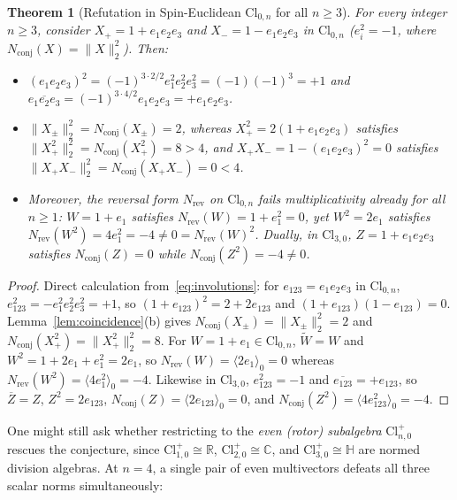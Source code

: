 \documentclass[11pt]{article}
\newtheorem{theorem}{Theorem}[section]
\theoremstyle{definition}
\newcommand{\Cl}{\mathrm{Cl}}
\newcommand{\R}{\mathbb{R}}
\newcommand{\C}{\mathbb{C}}
\newcommand{\HH}{\mathbb{H}}
\newcommand{\Nrev}{N_{\mathrm{rev}}}
\newcommand{\Nconj}{N_{\mathrm{conj}}}
\begin{document}
\begin{theorem}[Refutation in Spin-Euclidean $\Cl_{0,n}$ for all $n\ge 3$]\label{thm:ref-spin}
For every integer $n\ge 3$, consider $X_+=1+e_1e_2e_3$ and $X_-=1-e_1e_2e_3$ in $\Cl_{0,n}$ ($e_i^2=-1$, where $\Nconj(X)=\|X\|_2^2$). Then:
\begin{itemize}
  \item[(a)] $(e_1e_2e_3)^2=(-1)^{3\cdot 2/2}e_1^2e_2^2e_3^2=(-1)(-1)^3=+1$ and $\overline{e_1e_2e_3}=(-1)^{3\cdot 4/2}e_1e_2e_3=+e_1e_2e_3$.
  \item[(b)] $\|X_\pm\|_2^2=\Nconj(X_\pm)=2$, whereas $X_+^2=2(1+e_1e_2e_3)$ satisfies $\|X_+^2\|_2^2=\Nconj(X_+^2)=8>4$, and $X_+X_-=1-(e_1e_2e_3)^2=0$ satisfies $\|X_+X_-\|_2^2=\Nconj(X_+X_-)=0<4$.
  \item[(c)] Moreover, the reversal form $\Nrev$ on $\Cl_{0,n}$ fails multiplicativity already for all $n\ge 1$: $W=1+e_1$ satisfies $\Nrev(W)=1+e_1^2=0$, yet $W^2=2e_1$ satisfies $\Nrev(W^2)=4e_1^2=-4\ne 0=\Nrev(W)^2$. Dually, in $\Cl_{3,0}$, $Z=1+e_1e_2e_3$ satisfies $\Nconj(Z)=0$ while $\Nconj(Z^2)=-4\ne 0$.
\end{itemize}
\end{theorem}
\begin{proof}
Direct calculation from~\eqref{eq:involutions}: for $e_{123}=e_1e_2e_3$ in $\Cl_{0,n}$, $e_{123}^2=-e_1^2e_2^2e_3^2=+1$, so $(1+e_{123})^2=2+2e_{123}$ and $(1+e_{123})(1-e_{123})=0$. Lemma~\ref{lem:coincidence}(b) gives $\Nconj(X_\pm)=\|X_\pm\|_2^2=2$ and $\Nconj(X_+^2)=\|X_+^2\|_2^2=8$. For $W=1+e_1\in\Cl_{0,n}$, $\widetilde{W}=W$ and $W^2=1+2e_1+e_1^2=2e_1$, so $\Nrev(W)=\langle 2e_1\rangle_0=0$ whereas $\Nrev(W^2)=\langle 4e_1^2\rangle_0=-4$. Likewise in $\Cl_{3,0}$, $e_{123}^2=-1$ and $\overline{e_{123}}=+e_{123}$, so $\overline{Z}=Z$, $Z^2=2e_{123}$, $\Nconj(Z)=\langle 2e_{123}\rangle_0=0$, and $\Nconj(Z^2)=\langle 4e_{123}^2\rangle_0=-4$.
\end{proof}

One might still ask whether restricting to the \emph{even (rotor) subalgebra} $\Cl_{n,0}^+$ rescues the conjecture, since $\Cl_{1,0}^+\cong\R$, $\Cl_{2,0}^+\cong\C$, and $\Cl_{3,0}^+\cong\HH$ are normed division algebras. At $n=4$, a single pair of even multivectors defeats all three scalar norms simultaneously:
\end{document}
